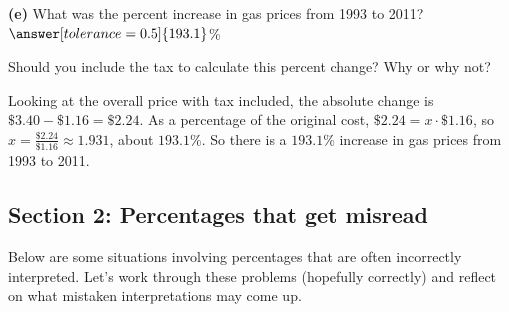 \documentclass[12pt]{ximera}
\begin{document}
\begin{problem}
\begin{prompt}
\textbf{(e)} What was the percent increase in gas prices from 1993 to 2011?
$\answer[tolerance=0.5]{193.1}$\%

Should you include the tax to calculate this percent change? Why or why not?
\begin{freeResponse}
\end{freeResponse}

\begin{solution}
Looking at the overall price with tax included, the absolute change is
$\$3.40 - \$1.16 = \$2.24$. As a percentage of the original cost,
$\$2.24 = x \cdot \$1.16$, so $x = \frac{\$2.24}{\$1.16} \approx 1.931$, about
$193.1\%$. So there is a $193.1\%$ increase in gas prices from 1993 to 2011.
\end{solution}
\end{prompt}
\end{problem}

\subsection*{Section 2: Percentages that get misread}

Below are some situations involving percentages that are often incorrectly
interpreted. Let's work through these problems (hopefully correctly) and reflect on
what mistaken interpretations may come up.
\end{document}
